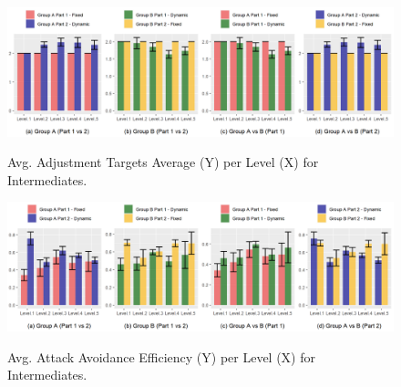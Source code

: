 \begin{figure}[!ht]
    \begin{center}
    \caption{Avg. Adjustment Targets Average (Y) per Level (X) for Intermediates.}
        \includegraphics[width=\textwidth]{figures/adjustment_target_level-intermediate_players.png}
        \label{fig:result-metric-intermediate-adjustment-target-level}
    \end{center}
\end{figure}

\begin{figure}[!ht]
    \begin{center}
    \caption{Avg. Attack Avoidance Efficiency (Y) per Level (X) for Intermediates.}
        \includegraphics[width=\textwidth]{figures/attack_avoidance_efficiency-intermediate_players.png}
        \label{fig:result-metric-intermediates-attack-avoidance-efficiency}
    \end{center}
\end{figure}

